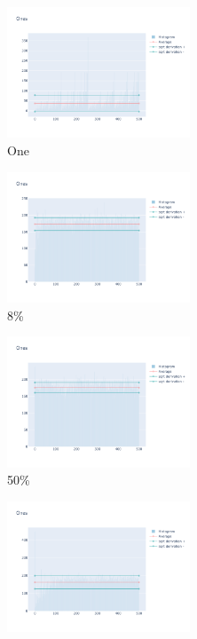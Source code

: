 \documentclass[12pt, fleqn]{report}                             %
\theoremstyle{break}                                            %
\begin{document}
      \begin{figure}[ht!]
        \centering
        \begin{subfigure}[b]{0.4\linewidth}
          \includegraphics[width=0.6\textwidth]{Images/22/dia-a.png}
          \caption{One}
        \end{subfigure}
        \begin{subfigure}[b]{0.4\linewidth}
          \includegraphics[width=0.6\textwidth]{Images/22/dia-b.png}
          \caption{8\%}
        \end{subfigure}
        \begin{subfigure}[b]{0.4\linewidth}
          \includegraphics[width=0.6\textwidth]{Images/22/dia-c.png}
          \caption{50\%}
        \end{subfigure}
        \begin{subfigure}[b]{0.4\linewidth}
          \includegraphics[width=0.6\textwidth]{Images/22/dia-d.png}

\end{subfigure}
\end{figure}
\end{document}
